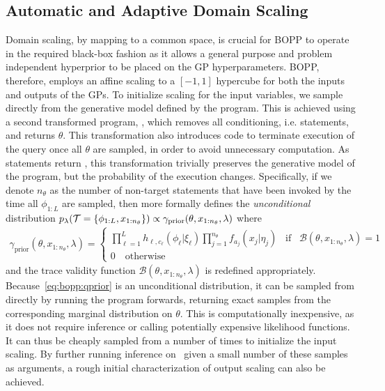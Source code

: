 
\subsection{Automatic and Adaptive Domain Scaling}
\label{sec:bopp:domain}

Domain scaling, by mapping to a common space, is crucial for BOPP to operate in the required black-box fashion as it allows a general purpose and problem independent hyperprior to be placed on the GP hyperparameters.  BOPP, therefore, employs an affine scaling to a $[-1,1]$ hypercube for both the inputs and outputs of the GPs.  To initialize scaling for the input variables, we sample directly from the generative model defined by the program. %
This is achieved using a second transformed program, \qprior, which removes all conditioning, i.e. \observe statements, and returns $\theta$.  This transformation also introduces code to terminate execution of the query once all $\theta$ are sampled, in order to avoid unnecessary computation.
As \observe statements return , this transformation trivially preserves the generative model of the program, 
but the probability of the execution changes. Specifically, if we denote $n_{\theta}$ as the number of non-target \sample 
statements that have been invoked by the time all $\phi_{1:L}$ are sampled, then \qprior more formally defines the
\emph{unconditional} distribution $p_{\lambda}(\mathcal{T} = \{\phi_{1:L},x_{1:n_{\theta}}\}) \propto 
\gamma_{\text{prior}}(\theta,x_{1:n_{\theta}},\lambda)$ where
\begin{align}
\label{eq:bopp:qprior}
\gamma_{\text{prior}}(\theta,x_{1:n_{\theta}},\lambda)= \begin{cases}
\prod_{\ell=1}^{L}
h_{\ell,c_{\ell}} (\phi_{\ell} | \xi_{\ell})
\prod_{j=1}^{n_{\theta}} 
f_{a_j}(x_j | \eta_j) \;\;\; \text{if} \;\;\; \mathcal{B}(\theta,x_{1:n_\theta},\lambda)=1 \\
0 \quad \text{otherwise}
\end{cases}
\end{align}
and the trace validity function $\mathcal{B}(\theta,x_{1:n_\theta},\lambda)$ is redefined appropriately.
Because~\eqref{eq:bopp:qprior} is an unconditional distribution, it can be sampled from directly by
running the program forwards, returning exact samples from the corresponding marginal distribution on $\theta$.
This is computationally inexpensive, as it does not require inference or calling potentially expensive 
likelihood functions.  It can thus be cheaply sampled from a number of times to initialize the input scaling.
By further running inference on \qmarg~given a small number of these samples as arguments, a rough initial characterization of output scaling can also be achieved.

